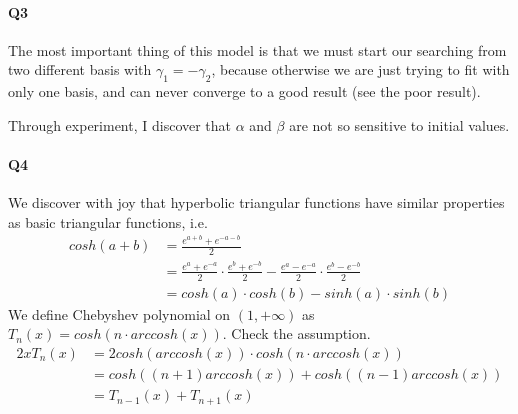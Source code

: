 \documentclass[11pt]{article}
\begin{document}
\paragraph{Q3}
The most important thing of this model is that we must start our searching from two different basis with $\gamma_1=-\gamma_2$, because otherwise we are just trying to fit with only one basis, and can never converge to a good result (see the poor result).
\begin{figure}[H]
	\centering
\end{figure}
Through experiment, I discover that $\alpha$ and $\beta$ are not so sensitive to initial values.
\paragraph{Q4}
We discover with joy that hyperbolic triangular functions have similar properties as basic triangular functions, i.e.
\begin{align}
	cosh(a+b)&=\frac{e^{a+b}+e^{-a-b}}{2}\\
	&=\frac{e^{a}+e^{-a}}{2}\cdot\frac{e^{b}+e^{-b}}{2}-\frac{e^{a}-e^{-a}}{2}\cdot\frac{e^{b}-e^{-b}}{2}\\
	&=cosh(a)\cdot cosh(b)-sinh(a)\cdot sinh(b)
\end{align}
We define Chebyshev polynomial on $(1,+\infty)$ as $T_n(x)=cosh(n\cdot arccosh(x))$. Check the assumption.
\begin{align}
	2xT_n(x)&=2cosh(arccosh(x))\cdot cosh(n\cdot arccosh(x))\\
	&=cosh((n+1)arccosh(x))+cosh((n-1)arccosh(x))\\
	&=T_{n-1}(x)+T_{n+1}(x)
\end{align}
\end{document}
